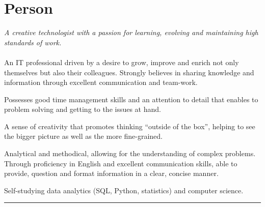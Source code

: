 \documentclass[10pt,a4paper]{article}
\begin{document}
{
	\fancyhf{}
	\setlength\headheight{43pt}
	\fancyfoot[CO]{}
}

\thispagestyle{firstpage}
\vspace*{-2.5em}

\section{Person}
\begin{multicols}{2}
    \noindent \small\emph{\color{gray}\small A creative technologist with a passion for learning, evolving and maintaining high standards of work.}\\\\
    \noindent An IT professional driven by a desire to grow, improve and enrich not only themselves but also their colleagues. Strongly believes in sharing knowledge and information through excellent communication and team-work.

    \noindent Possesses good time management skills and an attention to detail that enables to problem solving and getting to the issues at hand.
    
    \noindent A sense of creativity that promotes thinking ``outside of the box'', helping to see the bigger picture as well as the more fine-grained.

    \noindent Analytical and methodical, allowing for the understanding of complex problems. Through proficiency in English and excellent communication skills, able to provide, question and format information in a clear, concise manner.

    \noindent Self-studying data analytics (SQL, Python, statistics) and computer science.
\end{multicols}

\hrule
\vspace*{2em}
\end{document}
